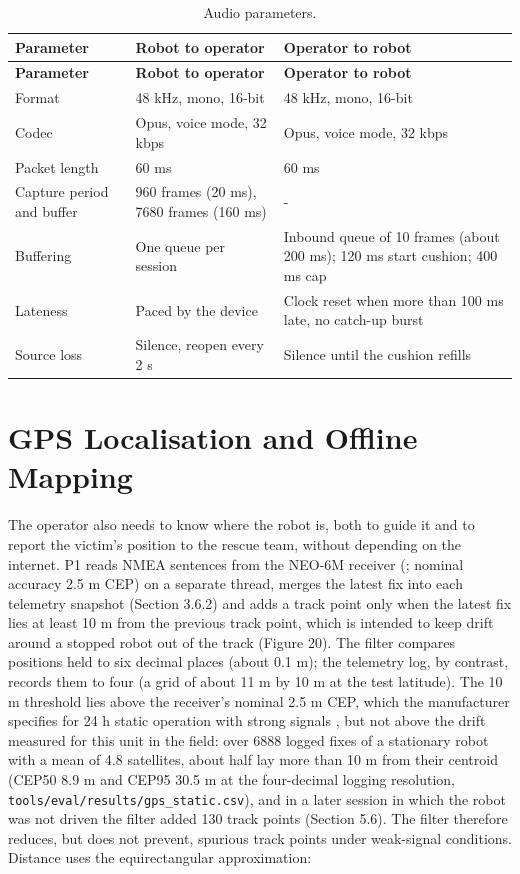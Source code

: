 \begin{center}
\begin{longtable}{|p{3cm}|p{4.5cm}|p{4.5cm}|}
\caption{Audio parameters.}
\label{tab:audio-parameters} \\
\hline
\textbf{Parameter} & \textbf{Robot to operator} & \textbf{Operator to robot} \\
\hline
\endfirsthead
\hline
\textbf{Parameter} & \textbf{Robot to operator} & \textbf{Operator to robot} \\
\hline
\endhead
Format & 48 kHz, mono, 16-bit & 48 kHz, mono, 16-bit \\
\hline
Codec & Opus, voice mode, 32 kbps & Opus, voice mode, 32 kbps \\
\hline
Packet length & 60 ms & 60 ms \\
\hline
Capture period and buffer & 960 frames (20 ms), 7680 frames (160 ms) & - \\
\hline
Buffering & One queue per session & Inbound queue of 10 frames (about 200 ms); 120 ms start cushion; 400 ms cap \\
\hline
Lateness & Paced by the device & Clock reset when more than 100 ms late, no catch-up burst \\
\hline
Source loss & Silence, reopen every 2 s & Silence until the cushion refills \\
\hline
\end{longtable}
\end{center}

\section{GPS Localisation and Offline Mapping}

The operator also needs to know where the robot is, both to guide it and to report the victim's position to the rescue team, without depending on the internet. P1 reads NMEA sentences from the NEO-6M receiver (\cite{ublox_neo6}; nominal accuracy 2.5 m CEP) on a separate thread, merges the latest fix into each telemetry snapshot (Section 3.6.2) and adds a track point only when the latest fix lies at least 10 m from the previous track point, which is intended to keep drift around a stopped robot out of the track (Figure 20). The filter compares positions held to six decimal places (about 0.1 m); the telemetry log, by contrast, records them to four (a grid of about 11 m by 10 m at the test latitude). The 10 m threshold lies above the receiver's nominal 2.5 m CEP, which the manufacturer specifies for 24 h static operation with strong signals \cite{ublox_neo6}, but not above the drift measured for this unit in the field: over 6888 logged fixes of a stationary robot with a mean of 4.8 satellites, about half lay more than 10 m from their centroid (CEP50 8.9 m and CEP95 30.5 m at the four-decimal logging resolution, \texttt{tools/eval/results/gps\_static.csv}), and in a later session in which the robot was not driven the filter added 130 track points (Section 5.6). The filter therefore reduces, but does not prevent, spurious track points under weak-signal conditions. Distance uses the equirectangular approximation:

